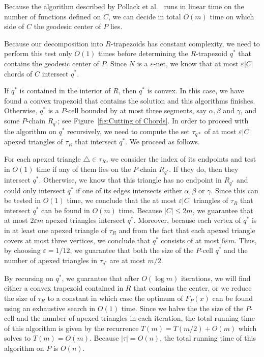 \documentclass[a4paper,UKenglish]{lipics}
\newcommand{\F}[2]{\ensuremath{F_{\scriptscriptstyle #1}(#2)}}
\begin{document}
Because the algorithm described by Pollack et al.~\cite[Section~3]{pollackComputingCenter} runs in linear time on the number of functions defined on $C$, we can decide in total $O(m)$ time on which side of $C$ the geodesic center of $P$ lies. 

Because our decomposition into $R$-trapezoids has constant complexity, we need to perform this test only $O(1)$ times before determining the $R$-trapezoid $q^*$ that contains the geodesic center of $P$. 
Since $N$ is a $\varepsilon$-net, we know that at most $\varepsilon |C|$ chords of $C$ intersect $q^*$.

If $q^*$ is contained in the interior of $R$, then $q^*$ is convex. In this case, we have found a convex trapezoid that contains the solution and this algorithms finishes. Otherwise, $q^*$ is a $P$-cell bounded by at most three segments, say $\alpha, \beta$ and $\gamma$, and some $P$-chain $R_{q^*}$; see Figure~\ref{fig:Cutting of Chords}. 
In order to proceed with the algorithm on  $q^*$ recursively, we need to compute the set $\tau_{q*}$ of at most $\varepsilon |C|$ apexed triangles of $\tau_R$ that intersect $q^*$. We proceed as follows.

For each apexed triangle $\triangle\in \tau_R$, we consider the index of its endpoints and test in $O(1)$ time if any of them lies on the $P$-chain $R_{q^*}$. If they do, then they intersect $q^*$. Otherwise, we know that this triangle has no endpoint in $R_{q^*}$ and could only intersect $q^*$ if one of its edges intersects either $\alpha, \beta$ or $\gamma$. Since this can be tested in $O(1)$ time, we conclude that the at most $\varepsilon |C|$ triangles of $\tau_R$ that intersect $q^*$ can be found in $O(m)$ time.
Because $|C| \leq 2m$, we guarantee that at most $2\varepsilon m$ apexed triangles intersect $q^*$. 
Moreover, because each vertex of $q^*$ is in at least one apexed triangle of $\tau_R$ and from the fact that each apexed triangle covers at most three vertices, we conclude that $q^*$ consists of at most $6 \varepsilon m$.
Thus, by choosing $\varepsilon = 1/12$, we guarantee that both the size of the $P$-cell $q^*$ and the number of apexed triangles in $\tau_{q^*}$ are at most $m/2$.

By recursing on $q^*$, we guarantee that after $O(\log m)$ iterations, we will find either a convex trapezoid contained in $R$ that contains the center, or we reduce the size of $\tau_R$ to a constant in which case the optimum of $\F{P}{x}$ can be found using an exhaustive search in $O(1)$ time. Since we halve the the size of the $P$-cell and the number of apexed triangles in each iteration, the total running time of this algorithm is given by the recurrence $T(m) = T(m/2) + O(m)$ which solves to $T(m) = O(m)$. 
Because $|\tau| = O(n)$, the total running time of this algorithm on $P$ is $O(n)$.
\end{document}
